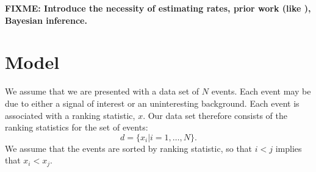 \documentclass[aps,prd,reprint]{revtex4-1}
\newcommand{\fixme}[1]{\textbf{FIXME: #1}}
\begin{document}
\fixme{Introduce the necessity of estimating rates, prior work (like
  \cite{Biswas2009}), Bayesian inference.}

\section{Model}

We assume that we are presented with a data set of $N$ events.  Each
event may be due to either a signal of interest or an uninteresting
background.  Each event is associated with a ranking statistic, $x$.
Our data set therefore consists of the ranking statistics for the set
of events:
\begin{equation}
  d = \{ x_i | i = 1, \ldots, N \}.
\end{equation}
We assume that the events are sorted by ranking statistic, so that $i
< j$ implies that $x_i < x_j$.  
\end{document}
